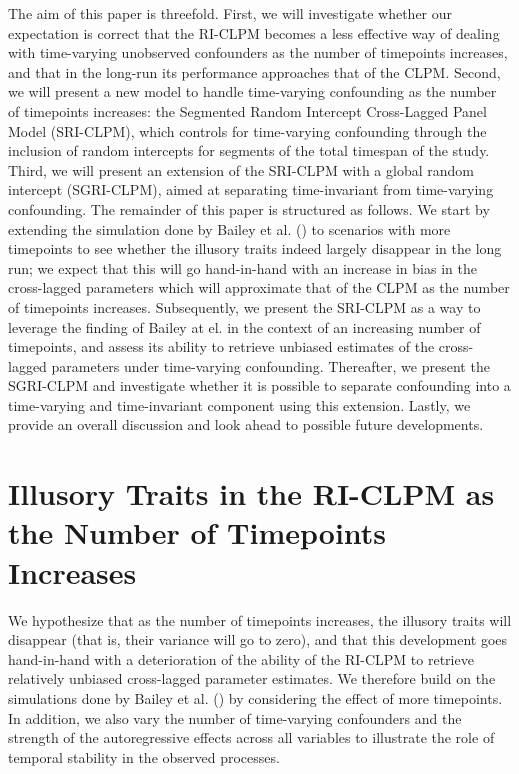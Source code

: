 \documentclass[
  man,
  floatsintext,
  longtable,
  nolmodern,
  notxfonts,
  notimes,
  colorlinks=true,linkcolor=blue,citecolor=blue,urlcolor=blue]{apa7}
\begin{document}
The aim of this paper is threefold. First, we will investigate whether
our expectation is correct that the RI-CLPM becomes a less effective way
of dealing with time-varying unobserved confounders as the number of
timepoints increases, and that in the long-run its performance
approaches that of the CLPM. Second, we will present a new model to
handle time-varying confounding as the number of timepoints increases:
the Segmented Random Intercept Cross-Lagged Panel Model (SRI-CLPM),
which controls for time-varying confounding through the inclusion of
random intercepts for segments of the total timespan of the study.
Third, we will present an extension of the SRI-CLPM with a global random
intercept (SGRI-CLPM), aimed at separating time-invariant from
time-varying confounding. The remainder of this paper is structured as
follows. We start by extending the simulation done by Bailey et al.
() to scenarios with
more timepoints to see whether the illusory traits indeed largely
disappear in the long run; we expect that this will go hand-in-hand with
an increase in bias in the cross-lagged parameters which will
approximate that of the CLPM as the number of timepoints increases.
Subsequently, we present the SRI-CLPM as a way to leverage the finding
of Bailey at el. in the context of an increasing number of timepoints,
and assess its ability to retrieve unbiased estimates of the
cross-lagged parameters under time-varying confounding. Thereafter, we
present the SGRI-CLPM and investigate whether it is possible to separate
confounding into a time-varying and time-invariant component using this
extension. Lastly, we provide an overall discussion and look ahead to
possible future developments.

\section{Illusory Traits in the RI-CLPM as the Number of Timepoints
Increases}\label{illusory-traits-in-the-ri-clpm-as-the-number-of-timepoints-increases}

We hypothesize that as the number of timepoints increases, the illusory
traits will disappear (that is, their variance will go to zero), and
that this development goes hand-in-hand with a deterioration of the
ability of the RI-CLPM to retrieve relatively unbiased cross-lagged
parameter estimates. We therefore build on the simulations done by
Bailey et al. () by
considering the effect of more timepoints. In addition, we also vary the
number of time-varying confounders and the strength of the
autoregressive effects across all variables to illustrate the role of
temporal stability in the observed processes.
\end{document}

